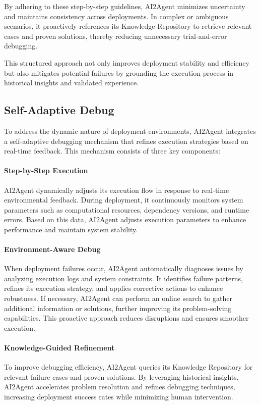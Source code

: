 By adhering to these step-by-step guidelines, AI2Agent minimizes uncertainty and maintains consistency across deployments. In complex or ambiguous scenarios, it proactively references its Knowledge Repository to retrieve relevant cases and proven solutions, thereby reducing unnecessary trial-and-error debugging.

This structured approach not only improves deployment stability and efficiency but also mitigates potential failures by grounding the execution process in historical insights and validated experience.

\subsection{Self-Adaptive Debug}
To address the dynamic nature of deployment environments, AI2Agent integrates a self-adaptive debugging mechanism that refines execution strategies based on real-time feedback. This mechanism consists of three key components:

\paragraph{Step-by-Step Execution} AI2Agent dynamically adjusts its execution flow in response to real-time environmental feedback. During deployment, it continuously monitors system parameters such as computational resources, dependency versions, and runtime errors. Based on this data, AI2Agent adjusts execution parameters to enhance performance and maintain system stability.

\paragraph{Environment-Aware Debug} When deployment failures occur, AI2Agent automatically diagnoses issues by analyzing execution logs and system constraints. It identifies failure patterns, refines its execution strategy, and applies corrective actions to enhance robustness. If necessary, AI2Agent can perform an online search to gather additional information or solutions, further improving its problem-solving capabilities. This proactive approach reduces disruptions and ensures smoother execution.

\paragraph{Knowledge-Guided Refinement} To improve debugging efficiency, AI2Agent queries its Knowledge Repository for relevant failure cases and proven solutions. By leveraging historical insights, AI2Agent accelerates problem resolution and refines debugging techniques, increasing deployment success rates while minimizing human intervention.

